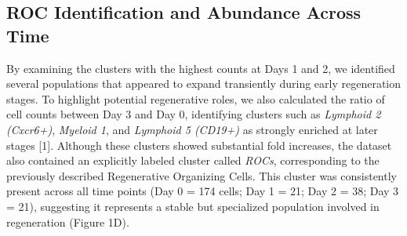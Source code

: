 \documentclass[11pt]{article}
\begin{document}
\subsection{ROC Identification and Abundance Across Time}
By examining the clusters with the highest counts at Days 1 and 2, we identified several populations that appeared to expand transiently during early regeneration stages. To highlight potential regenerative roles, we also calculated the ratio of cell counts between Day 3 and Day 0, identifying clusters such as \textit{Lymphoid 2 (Cxcr6+)}, \textit{Myeloid 1}, and \textit{Lymphoid 5 (CD19+)} as strongly enriched at later stages [1]. Although these clusters showed substantial fold increases, the dataset also contained an explicitly labeled cluster called \textit{ROCs}, corresponding to the previously described Regenerative Organizing Cells. This cluster was consistently present across all time points (Day 0 = 174 cells; Day 1 = 21; Day 2 = 38; Day 3 = 21), suggesting it represents a stable but specialized population involved in regeneration (Figure 1D). 
\begin{table}[h!]
\centering
\caption{Comparison of overlap between identified ROC marker genes and \textit{Established ROC Gene Markers} (Supplementary Table~3) across preprocessing and denoising methods.}
\label{tab:marker_overlap}
\end{table}
\end{document}

